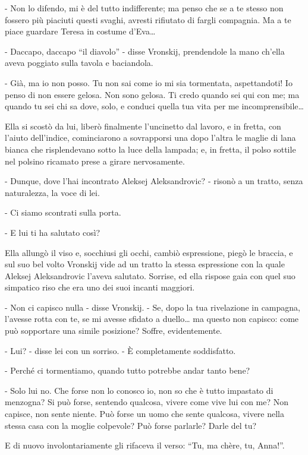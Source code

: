 - Non lo difendo, mi è del tutto indifferente; ma penso che se a te stesso non fossero più piaciuti questi svaghi, avresti rifiutato di fargli compagnia. Ma a te piace guardare Teresa in costume d'Eva\ldots{} 

- Daccapo, daccapo ``il diavolo'' - disse Vronskij, prendendole la mano ch'ella aveva poggiato sulla tavola e baciandola. 

- Già, ma io non posso. Tu non sai come io mi sia tormentata, aspettandoti! Io penso di non essere gelosa. Non sono gelosa. Ti credo quando sei qui con me; ma quando tu sei chi sa dove, solo, e conduci quella tua vita per me incomprensibile\ldots{} 

Ella si scostò da lui, liberò finalmente l'uncinetto dal lavoro, e in fretta, con l'aiuto dell'indice, cominciarono a sovrapporsi una dopo l'altra le maglie di lana bianca che risplendevano sotto la luce della lampada; e, in fretta, il polso sottile nel polsino ricamato prese a girare nervosamente. 

- Dunque, dove l'hai incontrato Aleksej Aleksandrovic? - risonò a un tratto, senza naturalezza, la voce di lei. 

- Ci siamo scontrati sulla porta. 

- E lui ti ha salutato così? 

Ella allungò il viso e, socchiusi gli occhi, cambiò espressione, piegò le braccia, e sul suo bel volto Vronskij vide ad un tratto la stessa espressione con la quale Aleksej Aleksandrovic l'aveva salutato. Sorrise, ed ella rispose gaia con quel suo simpatico riso che era uno dei suoi incanti maggiori. 

- Non ci capisco nulla - disse Vronskij. - Se, dopo la tua rivelazione in campagna, l'avesse rotta con te, se mi avesse sfidato a duello\ldots{} ma questo non capisco: come può sopportare una simile posizione? Soffre, evidentemente. 

- Lui? - disse lei con un sorriso. - È completamente soddisfatto. 

- Perché ci tormentiamo, quando tutto potrebbe andar tanto bene? 

- Solo lui no. Che forse non lo conosco io, non so che è tutto impastato di menzogna? Si può forse, sentendo qualcosa, vivere come vive lui con me? Non capisce, non sente niente. Può forse un uomo che sente qualcosa, vivere nella stessa casa con la moglie colpevole? Può forse parlarle? Darle del tu? 

E di nuovo involontariamente gli rifaceva il verso: ``Tu, ma chère, tu, Anna!''. 

